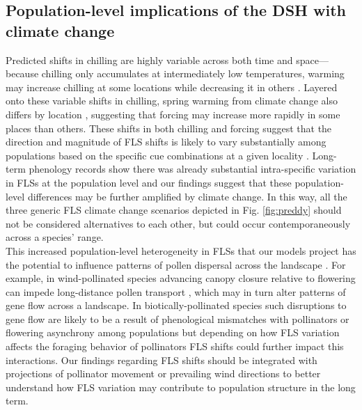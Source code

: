 \documentclass[12pt]{article}\usepackage[]{graphicx}\usepackage[]{color}
\begin{document}
\subsection*{Population-level implications of the DSH with climate change} 
\noindent Predicted shifts in chilling are highly variable across both time and space---because chilling only accumulates at intermediately low temperatures, warming may increase chilling at some locations while decreasing it in others \citep{Man2017,Zhang:2007aa}. Layered onto these variable shifts in chilling, spring warming from climate change also differs by location \citep{Karmalkar:2017aa,Loarie:2009aa}, suggesting that forcing may increase more rapidly in some places than others. These shifts in both chilling and forcing suggest that the direction and magnitude of FLS shifts is likely to vary substantially among populations based on the specific cue combinations at a given locality \citep{Chmielewski:2012aa}. Long-term phenology records show there was already substantial intra-specific variation in FLSs at the population level \citep{Buonaiuto2020} and our findings suggest that these population-level differences may be further amplified by climate change. In this way, all the three generic FLS climate change scenarios depicted in Fig. \ref{fig:preddy} should not be considered alternatives to each other, but could occur contemporaneously across a species' range. \\ 

\noindent This increased population-level heterogeneity in FLSs that our models project has the potential to influence patterns of pollen dispersal across the landscape \citep{Borycka2017,Pace:2018aa}. For example, in wind-pollinated species advancing canopy closure relative to flowering can impede long-distance pollen transport \citep{Milleron2012}, which may in turn alter patterns of gene flow across a landscape. In biotically-pollinated species such disruptions to gene flow are likely to be a result of phenological mismatches with pollinators \citep{Burkle:2013aa} or flowering asynchrony among populations \citep{Cresti:2013aa,Zohner:2018aa} but depending on how FLS variation affects the foraging behavior of pollinators FLS shifts could further impact this interactions. Our findings regarding FLS shifts should be integrated with projections of pollinator movement or prevailing wind directions \citep{Kling:2020aa} to better understand how FLS variation may contribute to population structure in the long term. \\
\end{document}
